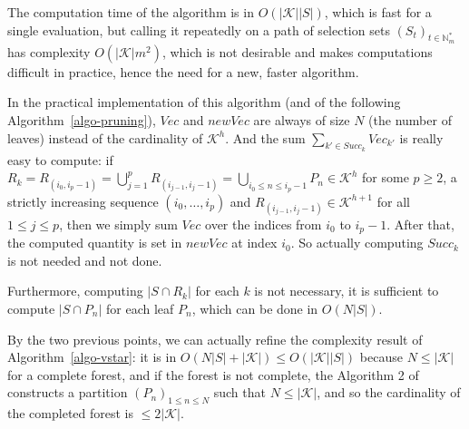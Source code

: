 \documentclass[
  11pt,
  a4paper,
]{article}
\theoremstyle{plain}
\theoremstyle{plain}
\theoremstyle{definition}
\theoremstyle{plain}
\theoremstyle{definition}
\theoremstyle{remark}
\newcounter{quartocallouttipno}
\newcommand{\quartocallouttip}[1]{\refstepcounter{quartocallouttipno}\label{#1}}
\begin{document}
The computation time of the algorithm is in \(O(|\mathcal{K}||S|)\),
which is fast for a single evaluation, but calling it repeatedly on a
path of selection sets \((S_t)_{t\in\mathbb{N}_m^*}\) has complexity
\(O(|\mathcal{K}|m^2)\), which is not desirable and makes computations
difficult in practice, hence the need for a new, faster algorithm.

\begin{tcolorbox}[enhanced jigsaw, left=2mm, coltitle=black, toptitle=1mm, colback=white, bottomtitle=1mm, breakable, title=\textcolor{quarto-callout-tip-color}{\faLightbulb}\hspace{0.5em}{Tip \ref*{tip-algo1}: Tip}, titlerule=0mm, arc=.35mm, opacityback=0, opacitybacktitle=0.6, colbacktitle=quarto-callout-tip-color!10!white, toprule=.15mm, bottomrule=.15mm, rightrule=.15mm, colframe=quarto-callout-tip-color-frame, leftrule=.75mm]

\quartocallouttip{tip-algo1} 

In the practical implementation of this algorithm (and of the following
Algorithm~\ref{algo-pruning}), \(Vec\) and \(newVec\) are always of size
\(N\) (the number of leaves) instead of the cardinality of
\(\mathcal{K}^h\). And the sum \(\sum_{k'\in Succ_k} Vec_{k'}\) is
really easy to compute: if
\(R_k= R_{(i_0,i_{p}-1)}= \bigcup_{ j=1}^{p} R_{(i_{ j-1}, i_{ j}-1)}=\bigcup_{i_0\leq n\leq i_{p}-1}P_n\in\mathcal{K}^h\)
for some \(p\geq2\), a strictly increasing sequence
\((i_0,\dotsc,i_{p})\) and
\(R_{(i_{ j-1}, i_{ j}-1)}\in\mathcal{K}^{h+1}\) for all
\(1\leq j\leq p\), then we simply sum \(Vec\) over the indices from
\(i_{0}\) to \(i_{p}-1\). After that, the computed quantity is set in
\(newVec\) at index \(i_0\). So actually computing \(Succ_k\) is not
needed and not done.

Furthermore, computing \(|S\cap R_k|\) for each \(k\) is not necessary,
it is sufficient to compute \(|S\cap P_n|\) for each leaf \(P_n\), which
can be done in \(O(N|S|)\).

By the two previous points, we can actually refine the complexity result
of Algorithm~\ref{algo-vstar}: it is in
\(O(N|S|+|\mathcal{K}|)\leq O(|\mathcal{K}||S|)\) because
\(N\leq|\mathcal{K}|\) for a complete forest, and if the forest is not
complete, the Algorithm 2 of \citet{MR4178188} constructs a partition
\((P_n)_{1\leq n\leq N}\) such that \(N\leq|\mathcal{K}|\), and so the
cardinality of the completed forest is \(\leq 2|\mathcal{K}|\).

\end{tcolorbox}
\end{document}
